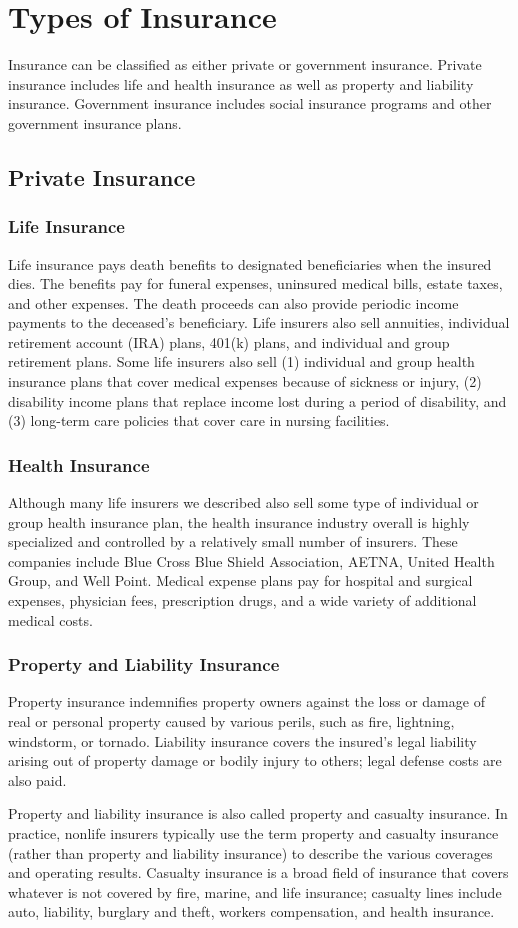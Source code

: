 \section{Types of Insurance}
Insurance can be classified as either private or government insurance. Private insurance includes life and health insurance as well as property and liability insurance. Government insurance includes social insurance programs and other government insurance plans.
%
\subsection{Private Insurance}
%
\subsubsection{Life Insurance}
Life insurance pays death benefits to designated
beneficiaries when the insured dies. The benefits pay for funeral expenses, uninsured medical bills, estate taxes, and other expenses. The death proceeds can also provide periodic income payments to the deceased’s beneficiary. Life insurers also sell annuities, individual retirement account (IRA) plans, 401(k) plans, and individual and group retirement plans. Some life insurers also sell (1) individual and group health insurance plans that cover medical expenses because of sickness or injury, (2) disability income plans that replace income lost during a period of disability, and (3) long-term care policies that cover care in nursing facilities.
%
\subsubsection{Health Insurance}
Although many life insurers we described also sell some type of individual or group health insurance plan, the health insurance industry overall is highly specialized and controlled by a relatively small number of insurers. These companies include Blue Cross Blue Shield Association, AETNA, United Health Group, and Well Point. Medical expense plans pay for hospital and surgical expenses, physician fees, prescription drugs, and a wide variety of additional medical costs.
%
\subsubsection{Property and Liability Insurance}
Property insurance indemnifies property owners against the loss or damage of real or personal property caused by various perils, such as fire, lightning, windstorm, or tornado. Liability insurance covers the insured’s legal liability arising out of property damage or bodily injury to others; legal defense costs are also paid.\\
\par
Property and liability insurance is also called property and casualty insurance. In practice, nonlife insurers typically use the term property and casualty insurance (rather than property and liability insurance) to describe the various coverages and operating results. Casualty insurance is a broad field of insurance that covers whatever is not covered by fire, marine, and life insurance; casualty lines include auto, liability, burglary and theft, workers compensation, and health insurance.
%
